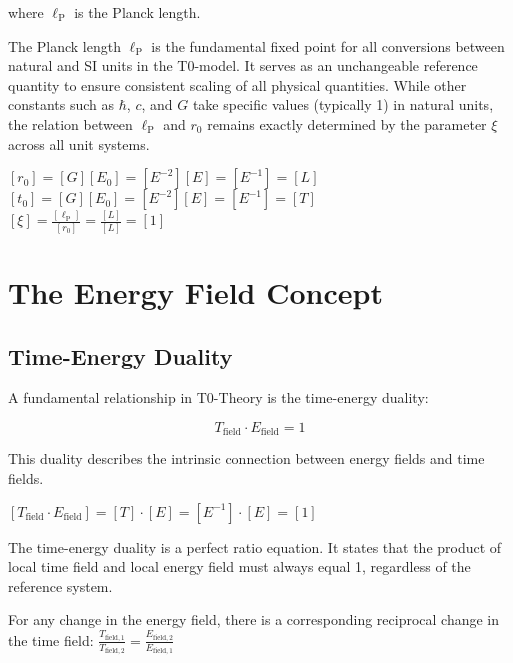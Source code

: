 \documentclass[12pt,a4paper]{article}
\newcommand{\tfield}{T_{\text{field}}}
\newcommand{\efield}{E_{\text{field}}}
\newcommand{\lp}{\ell_{\text{P}}}
\theoremstyle{definition}
\begin{document}
where $\lp$ is the Planck length.

\begin{wichtig}
	The Planck length $\lp$ is the fundamental fixed point for all conversions between natural and SI units in the T0-model. It serves as an unchangeable reference quantity to ensure consistent scaling of all physical quantities. While other constants such as $\hbar$, $c$, and $G$ take specific values (typically 1) in natural units, the relation between $\lp$ and $r_0$ remains exactly determined by the parameter $\xi$ across all unit systems.
\end{wichtig}

\begin{einheitencheck}
	$[r_0] = [G][E_0] = [E^{-2}][E] = [E^{-1}] = [L]$ \checkmark\\
	$[t_0] = [G][E_0] = [E^{-2}][E] = [E^{-1}] = [T]$ \checkmark\\
	$[\xi] = \frac{[\lp]}{[r_0]} = \frac{[L]}{[L]} = [1]$ \checkmark
\end{einheitencheck}

	\section{The Energy Field Concept}
	
	\subsection{Time-Energy Duality}
	
	A fundamental relationship in T0-Theory is the time-energy duality:
	
	\begin{equation}
		\boxed{\tfield \cdot \efield = 1}
	\end{equation}
	
	This duality describes the intrinsic connection between energy fields and time fields.
	
	\begin{einheitencheck}
		$[\tfield \cdot \efield] = [T] \cdot [E] = [E^{-1}] \cdot [E] = [1]$ \checkmark
	\end{einheitencheck}
	
	\begin{verhaltnis}
		The time-energy duality is a perfect ratio equation. It states that the product of local time field and local energy field must always equal 1, regardless of the reference system.
		
		For any change in the energy field, there is a corresponding reciprocal change in the time field:
		$\frac{T_{\text{field},1}}{T_{\text{field},2}} = \frac{E_{\text{field},2}}{E_{\text{field},1}}$
	\end{verhaltnis}
	
\end{document}
